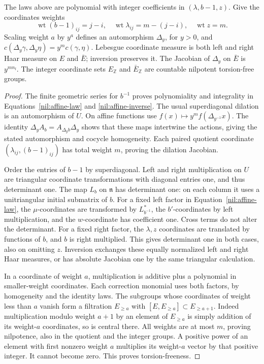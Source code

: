 \begin{lemma}\label{nil:grading}
The laws above are polynomial with integer coefficients in
\((\lambda,b-1,z)\). Give the coordinates weights
\[
 \operatorname{wt}(b-1)_{ij}=j-i,\quad
 \operatorname{wt}\lambda_{ij}=m-(j-i),\quad
 \operatorname{wt}z=m.
\]
Scaling weight \(a\) by \(y^a\) defines an automorphism \(\Delta_y\),
for \(y>0\), and \(c(\Delta_y\gamma,\Delta_y\eta)=y^m c(\gamma,\eta)\).
Lebesgue coordinate measure is both left and right Haar measure on
\(E\) and \(\bar E\); inversion preserves it. The Jacobian of
\(\Delta_y\) on \(\bar E\) is \(y^{mn_{\mathrm f}}\).
The integer coordinate sets \(E_{\mathbb Z}\) and \(\bar E_{\mathbb Z}\)
are countable nilpotent torsion-free groups.
\end{lemma}

\begin{proof}
The finite geometric series for \(b^{-1}\) proves polynomiality
and integrality in Equations~\ref{nil:affine-law} and
\ref{nil:affine-inverse}. The usual superdiagonal dilation is
an automorphism of \(U\). On affine functions use
\(f(x)\mapsto y^mf(\Delta_{y^{-1}}x)\).
The identity \(\Delta_y A_b=A_{\Delta_y b}\Delta_y\) shows that
these maps intertwine the actions, giving the stated automorphism
and cocycle homogeneity. Each paired quotient coordinate
\((\lambda_{ij},(b-1)_{ij})\) has total weight \(m\), proving
the dilation Jacobian.

Order the entries of \(b-1\) by superdiagonal. Left and right
multiplication on \(U\) are triangular coordinate transformations
with diagonal entries one, and thus determinant one. The map
\(L_b\) on \(\mathfrak n\) has determinant one: on each column it
uses a unitriangular initial submatrix of \(b\).
For a fixed left factor in Equation~\ref{nil:affine-law}, the
\(\mu\)-coordinates are transformed by \(L_{b^{-1}}^*\), the
\(b'\)-coordinates by left multiplication, and the \(w\)-coordinate
has coefficient one. Cross terms do not alter the determinant.
For a fixed right factor, the \(\lambda,z\) coordinates are
translated by functions of \(b\), and \(b\) is right multiplied.
This gives determinant one in both cases, also on omitting \(z\).
Inversion exchanges these equally normalized left and right Haar
measures, or has absolute Jacobian one by the same triangular
calculation.

In a coordinate of weight \(a\), multiplication is additive plus
a polynomial in smaller-weight coordinates. Each correction
monomial uses both factors, by homogeneity and the identity laws.
The subgroups whose coordinates of weight less than \(a\) vanish
form a filtration \(E_{\ge a}\) with
\([E,E_{\ge a}]\subset E_{\ge a+1}\). Indeed multiplication
modulo weight \(a+1\) by an element of \(E_{\ge a}\) is simply
addition of its weight-\(a\) coordinates, so is central there.
All weights are at most \(m\), proving nilpotence, also in the
quotient and the integer groups. A positive power of an element
with first nonzero weight \(a\) multiplies its weight-\(a\) vector
by that positive integer. It cannot become zero. This proves
torsion-freeness.
\end{proof}

